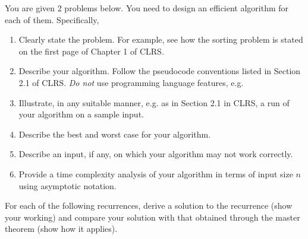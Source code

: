 \documentclass[a4paper]{exam}
\begin{document}
\begin{questions}
\question You are given 2 problems below. You need to design an efficient algorithm for each of them. Specifically,
    \begin{enumerate}
    \renewcommand{\theenumi}{\roman{enumi}} %
    \item Clearly state the problem. For example, see how the sorting problem is stated on the first page of Chapter 1 of CLRS.
    \item Describe your algorithm. Follow the pseudocode conventions listed in Section 2.1 of CLRS. \textit{Do not} use programming language features, e.g. 
    \item Illustrate, in any suitable manner, e.g. as in Section 2.1 in CLRS, a run of your algorithm on a sample input.
    \item Describe the best and worst case for your algorithm.
    \item Describe an input, if any, on which your algorithm may not work correctly.
    \item Provide a time complexity analysis of your algorithm in terms of input size $n$ using asymptotic notation.
    \end{enumerate}

  
\question For each of the following recurrences, derive a solution to the recurrence (show your working) and compare your solution with that obtained through the master theorem (show how it applies). 
  \begin{parts}

\end{parts}
\end{questions}
\end{document}
